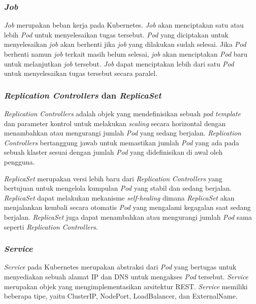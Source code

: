 \subsubsection{\emph{Job}}

\emph{Job} merupakan beban kerja pada Kubernetes. \emph{Job} akan menciptakan satu atau
lebih \emph{Pod} untuk menyelesaikan tugas tersebut. \emph{Pod} yang diciptakan untuk menyelesaikan
\emph{job} akan berhenti jika \emph{job} yang dilakukan sudah selesai. Jika \emph{Pod}
berhenti namun \emph{job} terkait masih belum selesai, \emph{job} akan menciptakan \emph{Pod}
baru untuk melanjutkan \emph{job} tersebut. \emph{Job} dapat menciptakan lebih dari satu
\emph{Pod} untuk menyelesaikan tugas tersebut secara paralel.

\subsubsection{\emph{Replication Controllers} dan \emph{ReplicaSet}}

\emph{Replication Controllers} adalah objek yang mendefinisikan sebuah \emph{pod template}
dan parameter kontrol untuk melakukan \emph{scaling} secara horizontal dengan menambahkan
atau mengurangi jumlah \emph{Pod} yang sedang berjalan. \emph{Replication Controllers}
bertanggung jawab untuk memastikan jumlah \emph{Pod} yang ada pada sebuah klaster
sesuai dengan jumlah \emph{Pod} yang didefinisikan di awal oleh pengguna.

\emph{ReplicaSet} merupakan versi lebih baru dari \emph{Replication Controllers} yang
bertujuan untuk mengelola kumpulan \emph{Pod} yang stabil dan sedang berjalan. \emph{ReplicaSet}
dapat melakukan mekanisme \emph{self-healing} dimana \emph{ReplicaSet} akan menjalankan
kembali secara otomatis \emph{Pod} yang mengalami kegagalan saat sedang berjalan. \emph{ReplicaSet}
juga dapat menambahkan atau mengurangi jumlah \emph{Pod} sama seperti \emph{Replication Controllers}.

\subsubsection{\emph{Service}}

\emph{Service} pada Kubernetes merupakan abstraksi dari \emph{Pod} yang bertugas untuk
menyediakan sebuah alamat IP dan DNS untuk mengakses \emph{Pod} tersebut. \emph{Service}
merupakan objek yang mengimplementasikan arsitektur REST. \emph{Service} memiliki beberapa tipe,
yaitu ClusterIP, NodePort, LoadBalancer, dan ExternalName.

